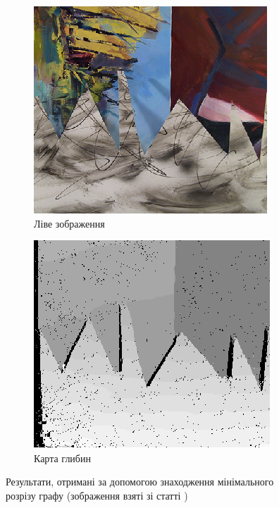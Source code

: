 \begin{figure}[h]
  \centering
  \begin{subfigure}[b]{0.45\textwidth}
      \includegraphics[width=\textwidth]{images/overview_kolmogorov_graphcut_left}
      \caption{Ліве зображення}
  \end{subfigure}
  \hfill
  \begin{subfigure}[b]{0.45\textwidth}
      \includegraphics[width=\textwidth]{images/overview_kolmogorov_graphcut_result}
      \caption{Карта глибин}
  \end{subfigure}
  \caption{Результати,
           отримані за допомогою знаходження мінімального розрізу графу
           (зображення взяті зі статті \cite{overview:kolmogorov:graphcut})}
  \label{fig:overview:kolmogorov:graphcut}
\end{figure}

